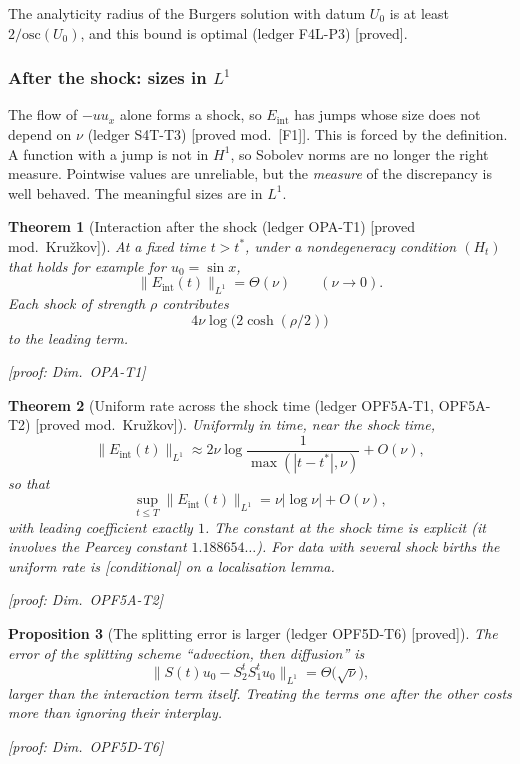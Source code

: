 \documentclass[11pt]{article}
\theoremstyle{plain}
\newtheorem{theorem}{Theorem}[section]
\newtheorem{proposition}[theorem]{Proposition}
\theoremstyle{definition}
\theoremstyle{remark}
\newcommand{\Eint}{E_{\mathrm{int}}}        %
\newcommand{\badge}[2]{\textcolor{#1}{\textsf{\footnotesize[#2]}}}
\newcommand{\proved}[1][]{\badge{cC}{proved#1}}
\newcommand{\modulo}[1]{\badge{cD}{proved mod.\ #1}}
\newcommand{\condl}{\badge{cD}{conditional}}
\newcommand{\led}[1]{\textcolor{cG}{\textsf{\footnotesize(ledger #1)}}}
\newcommand{\dimref}[1]{\textsf{\footnotesize[proof: Dim.~#1]}}
\begin{document}
The analyticity radius of the Burgers solution with datum $U_0$ is at least $2/\mathrm{osc}(U_0)$, and this bound is optimal \led{F4L-P3} \proved.

\subsubsection{After the shock: sizes in $L^1$}

The flow of $-uu_x$ alone forms a shock, so $\Eint$ has jumps whose size does not depend on $\nu$ \led{S4T-T3} \modulo{[F1]}. This is forced by the definition. A function with a jump is not in $H^1$, so Sobolev norms are no longer the right measure. Pointwise values are unreliable, but the \emph{measure} of the discrepancy is well behaved. The meaningful sizes are in $L^1$.

\begin{theorem}[{Interaction after the shock \led{OPA-T1} \modulo{Kru\v zkov}}]\label{thm:shock}
At a fixed time $t>t^*$, under a nondegeneracy condition $(H_t)$ that holds for example for $u_0=\sin x$,
\[
\|\Eint(t)\|_{L^1}=\Theta(\nu)\qquad(\nu\to0).
\]
Each shock of strength $\rho$ contributes
\[
4\nu\log\big(2\cosh(\rho/2)\big)
\]
to the leading term.

\dimref{OPA-T1}
\end{theorem}

\begin{theorem}[{Uniform rate across the shock time \led{OPF5A-T1, OPF5A-T2} \modulo{Kru\v zkov}}]\label{thm:uniform}
Uniformly in time, near the shock time,
\[
\|\Eint(t)\|_{L^1}\approx2\nu\log\frac{1}{\max(|t-t^*|,\nu)}+O(\nu),
\]
so that
\[
\sup_{t\le T}\|\Eint(t)\|_{L^1}=\nu|\log\nu|+O(\nu),
\]
with leading coefficient exactly $1$. The constant at the shock time is explicit (it involves the Pearcey constant $1.188654\ldots$). For data with several shock births the uniform rate is \condl{} on a localisation lemma.

\dimref{OPF5A-T2}
\end{theorem}

\begin{proposition}[{The splitting error is larger \led{OPF5D-T6} \proved}]\label{prop:splitting}
The error of the splitting scheme ``advection, then diffusion'' is
\[
\|S(t)u_0-S_2^tS_1^tu_0\|_{L^1}=\Theta\big(\sqrt\nu\big),
\]
larger than the interaction term itself. Treating the terms one after the other costs more than ignoring their interplay.

\dimref{OPF5D-T6}
\end{proposition}
\end{document}
